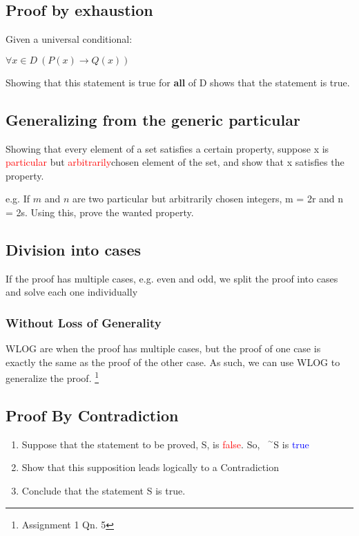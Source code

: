 \documentclass{article}
\newcommand{\negation}{${\phantom{0}}^\sim$}
\begin{document}
\subsection{Proof by exhaustion}
Given a universal conditional:
\begin{center}
    $\forall x \in D\ (P(x)\rightarrow Q(x))$
\end{center}
Showing that this statement is true for \textbf{all} of D shows that the statement is true.

\subsection{Generalizing from the generic particular}
Showing that every element of a set satisfies a certain property, suppose x is \textcolor{red}{particular} but \textcolor{red}{arbitrarily}chosen element of the set, and show that x satisfies the property.

e.g.
If $m$ and $n$ are two particular but arbitrarily chosen integers, m = 2r and n = 2s. Using this, prove the wanted property.

\subsection{Division into cases}
If the proof has multiple cases, e.g. even and odd, we split the proof into cases and solve each one individually

\subsubsection{Without Loss of Generality}
WLOG are when the proof has multiple cases, but the proof of one case is exactly the same as the proof of the other case. As such, we can use WLOG to generalize the proof. \footnote{Assignment 1 Qn. 5}


\subsection{Proof By Contradiction}
\begin{enumerate}
    \item Suppose that the statement to be proved, S, is \textcolor{red}{false}. So, \negation S is \textcolor{blue}{true}
    \item Show that this supposition leads logically to a Contradiction
    \item Conclude that the statement S is true.
\end{enumerate}
\end{document}
